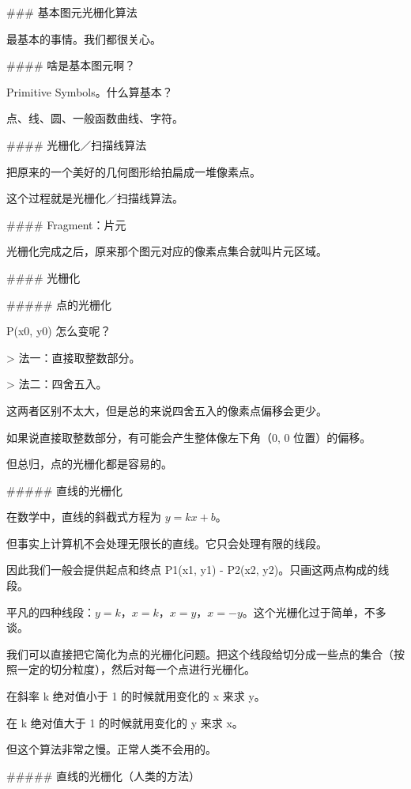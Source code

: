 \documentclass[
]{article}
\newenvironment{Shaded}{}{}
\newcommand{\DataTypeTok}[1]{\textcolor[rgb]{0.56,0.13,0.00}{#1}}
\newcommand{\FunctionTok}[1]{\textcolor[rgb]{0.02,0.16,0.49}{#1}}
\newcommand{\NormalTok}[1]{#1}
\begin{document}
\begin{Shaded}
\begin{Highlighting}[]
\FunctionTok{### 基本图元光栅化算法}

\NormalTok{最基本的事情。我们都很关心。}

\FunctionTok{#### 啥是基本图元啊？}

\NormalTok{Primitive Symbols。什么算基本？}

\NormalTok{点、线、圆、一般函数曲线、字符。}

\FunctionTok{#### 光栅化／扫描线算法}

\NormalTok{把原来的一个美好的几何图形给拍扁成一堆像素点。}

\NormalTok{这个过程就是光栅化／扫描线算法。}

\FunctionTok{#### Fragment：片元}

\NormalTok{光栅化完成之后，原来那个图元对应的像素点集合就叫片元区域。}

\FunctionTok{#### 光栅化}

\FunctionTok{##### 点的光栅化}

\NormalTok{P(x0, y0) 怎么变呢？}

\NormalTok{>}\DataTypeTok{ 法一：直接取整数部分。}

\NormalTok{>}\DataTypeTok{ 法二：四舍五入。}

\NormalTok{这两者区别不太大，但是总的来说四舍五入的像素点偏移会更少。}

\NormalTok{如果说直接取整数部分，有可能会产生整体像左下角（0, 0 位置）的偏移。}

\NormalTok{但总归，点的光栅化都是容易的。}

\FunctionTok{##### 直线的光栅化}

\NormalTok{在数学中，直线的斜截式方程为 $y = k x + b$。}

\NormalTok{但事实上计算机不会处理无限长的直线。它只会处理有限的线段。}

\NormalTok{因此我们一般会提供起点和终点 P1(x1, y1) - P2(x2, y2)。只画这两点构成的线段。}

\NormalTok{平凡的四种线段：$y = k$，$x = k$，$x = y$，$x = -y$。这个光栅化过于简单，不多谈。}

\NormalTok{我们可以直接把它简化为点的光栅化问题。把这个线段给切分成一些点的集合（按照一定的切分粒度），然后对每一个点进行光栅化。}

\NormalTok{在斜率 k 绝对值小于 1 的时候就用变化的 x 来求 y。}

\NormalTok{在 k 绝对值大于 1 的时候就用变化的 y 来求 x。}

\NormalTok{但这个算法非常之慢。正常人类不会用的。}

\FunctionTok{##### 直线的光栅化（人类的方法）}


\end{Highlighting}
\end{Shaded}
\end{document}
